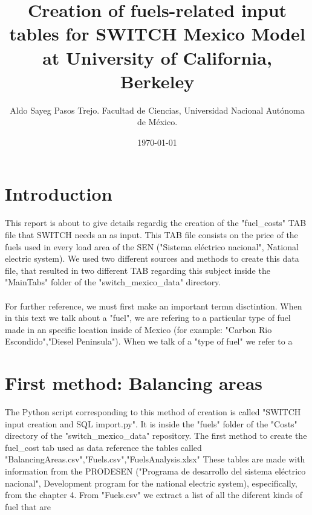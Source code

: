 \documentclass{article}
\author{Aldo Sayeg Pasos Trejo. Facultad de Ciencias, Universidad Nacional Autónoma de México.}
\date{\today}
\title{Creation of fuels-related input tables for SWITCH Mexico Model at University of California, Berkeley}
\begin{document}
\maketitle
\section{Introduction}
This report is about to give details regardig the creation of the "fuel\_costs" TAB file that SWITCH needs an as input. This TAB file consists on the price of the fuels used in every load area of the SEN ("Sistema eléctrico nacional", National electric system). We used two different sources and methods to create this data file, that resulted in two different TAB regarding this subject inside the "MainTabs" folder of the "switch\_mexico\_data" directory.
\\
\\For further reference, we must first make an important termn disctintion. When in this text we talk about a "fuel", we are refering to a particular type of fuel made in an specific location inside of Mexico (for example: "Carbon Rio Escondido","Diesel Peninsula"). When we talk of a "type of fuel" we refer to a 
\section{First method: Balancing areas}
The Python script corresponding to this method of creation is called "SWITCH input creation and SQL import.py". It is inside the "fuels" folder of the "Costs" directory of the "switch\_mexico\_data" repository.
The first method to create the fuel\_cost tab used as data reference the tables called "BalancingAreas.csv","Fuels.csv","FuelsAnalysis.xlsx" These tables are made with information from the PRODESEN ("Programa de desarrollo del sistema eléctrico nacional", Development program for the national electric system), especifically, from the chapter 4. From "Fuels.csv" we extract a list of all the diferent kinds of fuel that are
\end{document}
